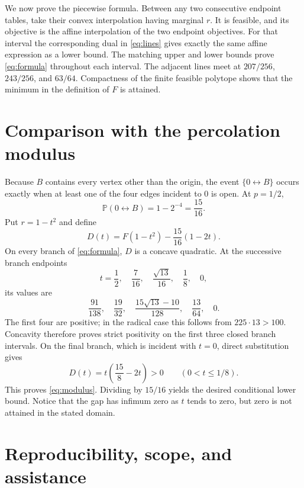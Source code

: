 \documentclass[11pt]{article}
\newcommand{\Prob}{\mathbb P}
\begin{document}
We now prove the piecewise formula.  Between any two consecutive endpoint
tables, take their convex interpolation having marginal $r$.  It is feasible,
and its objective is the affine interpolation of the two endpoint objectives.
For that interval the corresponding dual in \eqref{eq:lines} gives exactly the
same affine expression as a lower bound.  The matching upper and lower bounds
prove \eqref{eq:formula} throughout each interval.  The adjacent lines meet at
$207/256$, $243/256$, and $63/64$.  Compactness of the finite feasible
polytope shows that the minimum in the definition of $F$ is attained.

\section{Comparison with the percolation modulus}

Because $B$ contains every vertex other than the origin, the event
$\{0\leftrightarrow B\}$ occurs exactly when at least one of the four edges
incident to $0$ is open.  At $p=1/2$,
\[
 \Prob(0\leftrightarrow B)=1-2^{-4}=\frac{15}{16}.
\]
Put $r=1-t^2$ and define
\[
 D(t)=F(1-t^2)-\frac{15}{16}(1-2t).
\]
On every branch of \eqref{eq:formula}, $D$ is a concave quadratic.  At the
successive branch endpoints
\[
 t=\frac12,\quad\frac7{16},\quad\frac{\sqrt{13}}{16},
 \quad\frac18,\quad0,
\]
its values are
\begin{equation}\label{eq:gaps}
 \frac{91}{138},\quad \frac{19}{32},\quad
 \frac{15\sqrt{13}-10}{128},\quad \frac{13}{64},\quad0.
\end{equation}
The first four are positive; in the radical case this follows from
$225\cdot13>100$.  Concavity therefore proves strict positivity on the first
three closed branch intervals.  On the final branch, which is incident with
$t=0$, direct substitution gives
\[
 D(t)=t\left(\frac{15}{8}-2t\right)>0
 \qquad(0<t\leq1/8).
\]
This proves \eqref{eq:modulus}.  Dividing by $15/16$ yields the desired
conditional lower bound.  Notice that the gap has infimum zero as $t$ tends
to zero, but zero is not attained in the stated domain.

\section{Reproducibility, scope, and assistance}
\end{document}
